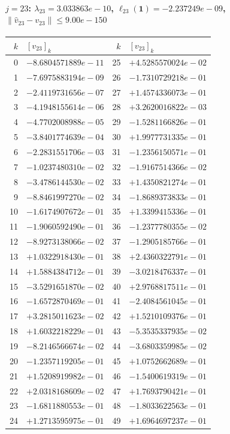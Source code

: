 \documentclass[11pt]{article}
\begin{document}
\paragraph{$j = 23$: $\lambda_{23} = 3.033863e-10$, \quad $\ell_{23}(\mathbf{1}) = -2.237249e-09$, \quad $\|\hat v_{23} - v_{23}\| \leq 9.00e-150$}
\begin{center}
{\footnotesize
\begin{tabular}{r@{\;\;}l@{\quad}r@{\;\;}l}
\toprule
$k$ & $[v_{23}]_k$ & $k$ & $[v_{23}]_k$ \\
\midrule
0 & $-8.6804571889e-11$ & 25 & $+4.5285570024e-02$ \\
1 & $-7.6975883194e-09$ & 26 & $-1.7310729218e-01$ \\
2 & $-2.4119731656e-07$ & 27 & $+1.4574336073e-01$ \\
3 & $-4.1948155614e-06$ & 28 & $+3.2620016822e-03$ \\
4 & $-4.7702008988e-05$ & 29 & $-1.5281166826e-01$ \\
5 & $-3.8401774639e-04$ & 30 & $+1.9977731335e-01$ \\
6 & $-2.2831551706e-03$ & 31 & $-1.2356150571e-01$ \\
7 & $-1.0237480310e-02$ & 32 & $-1.9167514366e-02$ \\
8 & $-3.4786144530e-02$ & 33 & $+1.4350821274e-01$ \\
9 & $-8.8461997270e-02$ & 34 & $-1.8689373833e-01$ \\
10 & $-1.6174907672e-01$ & 35 & $+1.3399415336e-01$ \\
11 & $-1.9060592490e-01$ & 36 & $-1.2377780355e-02$ \\
12 & $-8.9273138066e-02$ & 37 & $-1.2905185766e-01$ \\
13 & $+1.0322918430e-01$ & 38 & $+2.4360322791e-01$ \\
14 & $+1.5884384712e-01$ & 39 & $-3.0218476337e-01$ \\
15 & $-3.5291651870e-02$ & 40 & $+2.9768817511e-01$ \\
16 & $-1.6572870469e-01$ & 41 & $-2.4084561045e-01$ \\
17 & $+3.2815011623e-02$ & 42 & $+1.5210109376e-01$ \\
18 & $+1.6032218229e-01$ & 43 & $-5.3535337935e-02$ \\
19 & $-8.2146566674e-02$ & 44 & $-3.6803359985e-02$ \\
20 & $-1.2357119205e-01$ & 45 & $+1.0752662689e-01$ \\
21 & $+1.5208919982e-01$ & 46 & $-1.5400619319e-01$ \\
22 & $+2.0318168609e-02$ & 47 & $+1.7693790421e-01$ \\
23 & $-1.6811880553e-01$ & 48 & $-1.8033622563e-01$ \\
24 & $+1.2713595975e-01$ & 49 & $+1.6964697237e-01$ \\
\bottomrule
\end{tabular}
}
\end{center}
\end{document}
